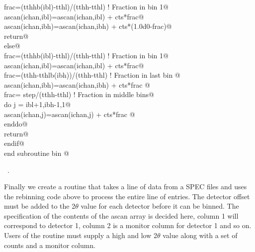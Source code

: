 \documentclass[10pt,a4paper,notitlepage]{article}
\begin{document}
\begin{flushleft}
\begin{minipage}{\linewidth}
\begin{list}{}{}
\mbox{}\verb@         frac=(tthhb(ibl)-tthl)/(tthh-tthl)          ! Fraction in bin 1@\\
\mbox{}\verb@         ascan(ichan,ibl)=ascan(ichan,ibl) + cts*frac@\\
\mbox{}\verb@         ascan(ichan,ibh)=ascan(ichan,ibh) + cts*(1.0d0-frac)@\\
\mbox{}\verb@         return@\\
\mbox{}\verb@      else@\\
\mbox{}\verb@         frac=(tthhb(ibl)-tthl)/(tthh-tthl)          ! Fraction in bin 1@\\
\mbox{}\verb@         ascan(ichan,ibl)=ascan(ichan,ibl) + cts*frac@\\
\mbox{}\verb@         frac=(tthh-tthlb(ibh))/(tthh-tthl)       ! Fraction in last bin @\\
\mbox{}\verb@         ascan(ichan,ibh)=ascan(ichan,ibh) + cts*frac @\\
\mbox{}\verb@         frac= step/(tthh-tthl)                ! Fraction in middle bins@\\
\mbox{}\verb@         do j = ibl+1,ibh-1,1@\\
\mbox{}\verb@           ascan(ichan,j)=ascan(ichan,j) + cts*frac @\\
\mbox{}\verb@         enddo@\\
\mbox{}\verb@         return@\\
\mbox{}\verb@      endif@\\
\mbox{}\verb@      end subroutine bin                                                     @{\NWsep}
\end{list}
\vspace{-1.5ex}
\footnotesize
\begin{list}{}{\setlength{\itemsep}{-\parsep}\setlength{\itemindent}{-\leftmargin}}
\item \NWtxtMacroRefIn\ .

\item{}
\end{list}
\end{minipage}\vspace{4ex}
\end{flushleft}
Finally we create a routine that takes a line of data from a SPEC files 
and uses the rebinning code above to process the entire line of entries. 
The detector offset must be added to the 2$\theta$ value for each detector
before it can be binned. 
The specification of the contents of the ascan array is decided here, column 1
will correspond to detector 1, column 2 is a monitor column for detector 1 and 
so on.
Users of the routine must supply a high and low 2$\theta$ value along with
a set of counts and a monitor column.
\end{document}
